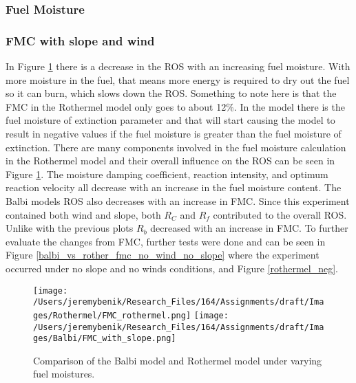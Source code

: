 \documentclass{article}
\begin{document}
\subsubsection{Fuel Moisture}
\subsubsection*{FMC with slope and wind}
\indent In Figure \ref{FMC} there is a decrease in the ROS with an increasing fuel moisture. With more moisture in the fuel, that means more energy is required to dry out the fuel so it can burn, which slows down the ROS. Something to note here is that the FMC in the Rothermel model only goes to about 12\%. In the model there is the fuel moisture of extinction parameter and that will start causing the model to result in negative values if the fuel moisture is greater than the fuel moisture of extinction. There are many components involved in the fuel moisture calculation in the Rothermel model and their overall influence on the ROS can be seen in Figure \ref{FMC}. The moisture damping coefficient, reaction intensity, and optimum reaction velocity all decrease with an increase in the fuel moisture content. The Balbi models ROS also decreases with an increase in FMC. Since this experiment contained both wind and slope, both $R_C$ and $R_f$ contributed to the overall ROS. Unlike with the previous plots $R_b$ decreased with an increase in FMC. To further evaluate the changes from FMC, further tests were done and can be seen in Figure \ref{balbi_vs_rother_fmc_no_wind_no_slope} where the experiment occurred under no slope and no winds conditions, and Figure \ref{rothermel_neg}. \\
\begin{figure}[!h]
\centering
  \texttt{[image: /Users/jeremybenik/Research\_Files/164/Assignments/draft/Images/Rothermel/FMC\_rothermel.png]}
  \texttt{[image: /Users/jeremybenik/Research\_Files/164/Assignments/draft/Images/Balbi/FMC\_with\_slope.png]}
  \caption{Comparison of the Balbi model and Rothermel model under varying fuel moistures.}
  \label{FMC}
\end{figure}
\end{document}
